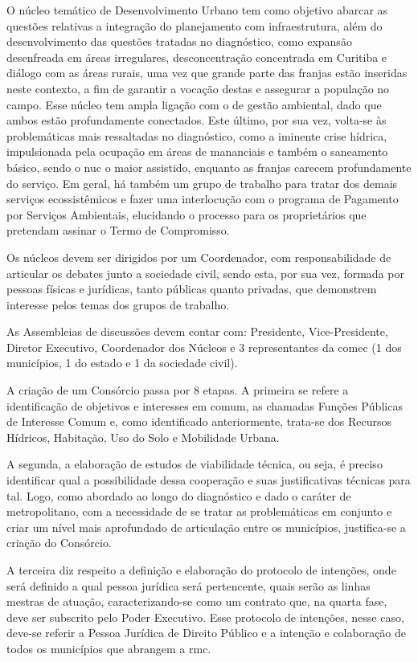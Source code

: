 	O núcleo temático de Desenvolvimento Urbano tem como objetivo abarcar as questões relativas a integração do planejamento com infraestrutura, além do desenvolvimento das questões tratadas no diagnóstico, como expansão desenfreada em áreas irregulares, desconcentração concentrada em Curitiba e diálogo com as áreas rurais, uma vez que grande parte das franjas estão inseridas neste contexto, a fim de garantir a vocação destas e assegurar a população no campo.  Esse núcleo tem ampla ligação com o de gestão ambiental, dado que ambos estão profundamente conectados. Este último, por sua vez, volta-se às problemáticas mais ressaltadas no diagnóstico, como a iminente crise hídrica, impulsionada pela ocupação em áreas de mananciais e também o saneamento básico, sendo o \gls{nuc} o maior assistido, enquanto as franjas carecem profundamente do serviço. Em geral, há também um grupo de trabalho para tratar dos demais serviços ecossistêmicos e fazer uma interlocução com o programa de Pagamento por Serviços Ambientais, elucidando o processo para os proprietários que pretendam assinar o Termo de Compromisso.
	
	Os núcleos devem ser dirigidos por um Coordenador, com responsabilidade de articular os debates junto a sociedade civil, sendo esta, por sua vez, formada por pessoas físicas e jurídicas, tanto públicas quanto privadas, que demonstrem interesse pelos temas dos grupos de trabalho.
	
	As Assembleias de discussões devem contar com: Presidente, Vice-Presidente, Diretor Executivo, Coordenador dos Núcleos e 3 representantes da \gls{comec} (1 dos municípios, 1 do estado e 1 da sociedade civil).
	
	A criação de um Consórcio passa por 8 etapas. A primeira se refere a identificação de objetivos e interesses em comum, as chamadas Funções Públicas de Interesse Comum e, como identificado anteriormente, trata-se dos Recursos Hídricos, Habitação, Uso do Solo e Mobilidade Urbana.
	
	A segunda, a elaboração de estudos de viabilidade técnica, ou seja, é preciso identificar qual a possibilidade dessa cooperação e suas justificativas técnicas para tal. Logo, como abordado ao longo do diagnóstico e dado o caráter de metropolitano, com a necessidade de se tratar as problemáticas em conjunto e criar um nível mais aprofundado de articulação entre os municípios, justifica-se a criação do Consórcio.
	
	A terceira diz respeito a definição e elaboração do protocolo de intenções, onde será definido a qual pessoa jurídica será pertencente, quais serão as linhas mestras de atuação, caracterizando-se como um contrato que, na quarta fase, deve ser subscrito pelo Poder Executivo. Esse protocolo de intenções, nesse caso, deve-se referir a Pessoa Jurídica de Direito Público e a intenção e colaboração de todos os municípios que abrangem a \gls{rmc}.
	
